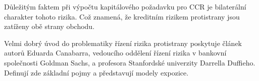 \documentclass[a4paper,12pt]{report}
\theoremstyle{definition} \newtheorem{definice}[veta]{Definice}
\theoremstyle{remark}
\begin{document}
Důležitým faktem při výpočtu kapitálového požadavku pro CCR je  bilaterální charakter tohoto rizika. Což znamená, že kreditním rizikem protistrany jsou zatíženy obě strany obchodu.

Velmi dobrý úvod do problematiky řízení rizika protistrany poskytuje článek \cite{canabarro2003measuring} autorů Eduarda Canabarra, vedoucího oddělení řízení rizika v bankovní společnosti Goldman Sachs, a profesora Stanfordské univerzity Darrella Duffieho.
Definují zde základní pojmy a představují modely expozice. %




\end{document}
